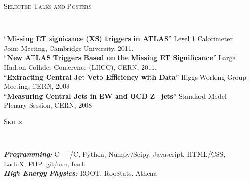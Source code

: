 \documentclass[9pt]{article}
\newenvironment{changemargin}[2]{%
  \begin{list}{}{%
    \setlength{\topsep}{0pt}%
    \setlength{\leftmargin}{#1}%
    \setlength{\rightmargin}{#2}%
    \setlength{\listparindent}{\parindent}%
    \setlength{\itemindent}{\parindent}%
    \setlength{\parsep}{\parskip}%
  }%
  \item[]}{\end{list}
}
\newcommand{\lineover}{
	\begin{changemargin}{-0.05in}{-0.05in}
		\vspace*{-8pt}
		\hrulefill \\
		\vspace*{-2pt}
	\end{changemargin}
}
\newcommand{\header}[1]{
	\begin{changemargin}{-0.5in}{-0.5in}
		\scshape{#1}\\
  	\lineover
	\end{changemargin}
}
\newenvironment{body} {
	\vspace*{-16pt}
	\begin{changemargin}{-0.25in}{-0.5in}
  }	
	{\end{changemargin}
}
\begin{document}
\header{Selected Talks and Posters}
\begin{body}
	\vspace{14pt}
        ``\textbf{Missing ET signicance (XS) triggers in ATLAS}'' Level 1 Calorimeter Joint Meeting, Cambridge University, 2011. \\
        \medskip
        ``\textbf{New ATLAS Triggers Based on the Missing ET Significance}'' Large Hadron Collider Conference (LHCC), CERN, 2011. \\
        ``\textbf{Extracting Central Jet Veto Efficiency with Data}'' Higgs Working Group Meeting, CERN, 2008 \\
        ``\textbf{Measuring Central Jets in EW and QCD Z+jets}'' Standard Model Plenary Session, CERN, 2008 \\
\end{body}

\smallskip



\header{Skills}

\begin{body}
	\vspace{14pt}
	\emph{\textbf{Programming:}}{} C++/C, Python, Numpy/Scipy, Javascript, HTML/CSS, \LaTeX, PHP, git/svn, bash \\
	\emph{\textbf{High Energy Physics:}}{} ROOT, RooStats, Athena\\
\end{body}

\smallskip
\end{document}
